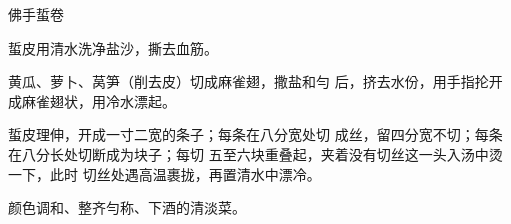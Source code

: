 \begin{recipe}{佛手蜇卷}

\ingredients


\cooking

\step 蜇皮用清水洗净盐沙，撕去血筋。

\step 黄瓜、萝卜、莴笋（削去皮）切成麻雀翅，撒盐和勻 后，挤去水份，用手指抡开成麻雀翅状，用冷水漂起。

\step 蜇皮理伸，开成一寸二宽的条子；每条在八分宽处切 成丝，留四分宽不切；每条在八分长处切断成为块子；每切 五至六块重叠起，夹着没有切丝这一头入汤中烫一下，此时 切丝处遇高温裹拢，再置清水中漂冷。

\notes

颜色调和、整齐勻称、下酒的清淡菜。

\end{recipe}

